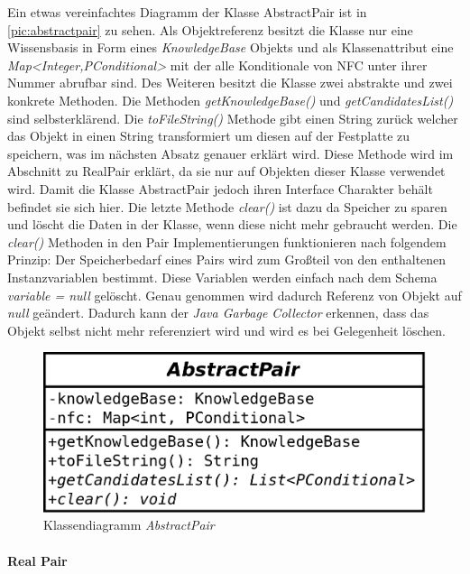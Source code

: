 \documentclass[12pt,a4paper]{article}
\begin{document}
Ein etwas vereinfachtes Diagramm der Klasse AbstractPair ist in \autoref{pic:abstractpair} zu sehen. Als Objektreferenz besitzt die Klasse nur eine Wissensbasis in Form eines \textit{KnowledgeBase} Objekts und als Klassenattribut eine \textit{Map<Integer,PConditional>} mit der alle Konditionale von NFC unter ihrer Nummer abrufbar sind. Des Weiteren besitzt die Klasse zwei abstrakte und zwei konkrete Methoden. Die Methoden \textit{getKnowledgeBase()} und \textit{getCandidatesList()} sind selbsterklärend. Die \textit{toFileString()} Methode gibt einen String zurück welcher das Objekt in einen String transformiert um diesen auf der Festplatte zu speichern, was im nächsten Absatz genauer erklärt wird. Diese Methode wird im Abschnitt zu RealPair erklärt, da sie nur auf Objekten dieser Klasse verwendet wird. Damit die Klasse AbstractPair jedoch ihren Interface Charakter behält befindet sie sich hier. Die letzte Methode \textit{clear()} ist dazu da Speicher zu sparen und löscht die Daten in der Klasse, wenn diese nicht mehr gebraucht werden. Die \textit{clear()} Methoden in den Pair Implementierungen funktionieren nach folgendem Prinzip: Der Speicherbedarf eines Pairs wird zum Großteil von den enthaltenen Instanzvariablen bestimmt. Diese Variablen werden einfach nach dem Schema \textit{variable = null} \glqq gelöscht\grqq . Genau genommen wird dadurch Referenz von Objekt auf \textit{null} geändert. Dadurch kann der \textit{Java Garbage Collector} erkennen, dass das Objekt selbst nicht mehr referenziert wird und wird es bei Gelegenheit löschen.




\begin{figure}
\includegraphics[width=0.45\linewidth]{bilder/AbstractPair.png}
\caption{Klassendiagramm \textit{AbstractPair}}
\label{pic:abstractpair}
\end{figure}


\paragraph{Real Pair}\mbox{}
\label{sec:realpair}
\end{document}

